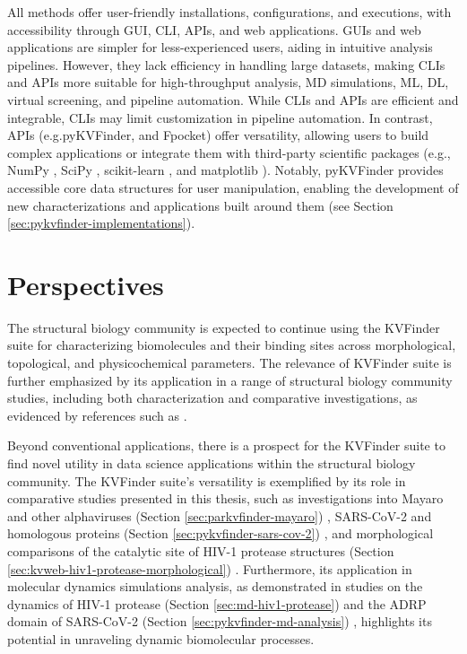 \documentclass[Ingles]{phdthesis}
\def\eg{e.g.\onedot}
\begin{document}
All methods offer user-friendly installations, configurations, and executions, with accessibility through \acs{GUI}, \acs{CLI}, \acp{API}, and web applications. \acsp{GUI} and web applications are simpler for less-experienced users, aiding in intuitive analysis pipelines. However, they lack efficiency in handling large datasets, making \acsp{CLI} and \acsp{API} more suitable for high-throughput analysis, \acs{MD} simulations, \acs{ML}, \acs{DL}, virtual screening, and pipeline automation. While \acsp{CLI} and \acsp{API} are efficient and integrable, \acsp{CLI} may limit customization in pipeline automation. In contrast, \acsp{API} (\eg pyKVFinder, and Fpocket) offer versatility, allowing users to build complex applications or integrate them with third-party scientific packages (\eg, NumPy \cite{numpy}, SciPy \cite{scipy}, scikit-learn \cite{scikit-learn}, and matplotlib \cite{matplotlib}). Notably, pyKVFinder provides accessible core data structures for user manipulation, enabling the development of new characterizations and applications built around them (see Section \ref{sec:pykvfinder-implementations}).

\section{Perspectives}

The structural biology community is expected to continue using the KVFinder suite for characterizing biomolecules and their binding sites across morphological, topological, and physicochemical parameters. The relevance of KVFinder suite is further emphasized by its application in a range of structural biology community studies, including both characterization and comparative investigations, as evidenced by references such as \cite{mendonca2021, mercaldi2022, santhakumari2023, premetis2023, jefferson2023, chen2023, kim2023}.

Beyond conventional applications, there is a prospect for the KVFinder suite to find novel utility in data science applications within the structural biology community. The KVFinder suite's versatility is exemplified by its role in comparative studies presented in this thesis, such as investigations into Mayaro and other alphaviruses (Section \ref{sec:parkvfinder-mayaro}) \cite{guerra2019}, SARS-CoV-2 and homologous proteins (Section \ref{sec:pykvfinder-sars-cov-2}) \cite{guerra2020}, and morphological comparisons of the catalytic site of HIV-1 protease structures (Section \ref{sec:kvweb-hiv1-protease-morphological}) \cite{guerra2023A}. Furthermore, its application in molecular dynamics simulations analysis, as demonstrated in studies on the dynamics of HIV-1 protease (Section \ref{sec:md-hiv1-protease})\cite{guerra2019} and the ADRP domain of SARS-CoV-2 (Section \ref{sec:pykvfinder-md-analysis}) \cite{guerra2020}, highlights its potential in unraveling dynamic biomolecular processes. 
\end{document}
